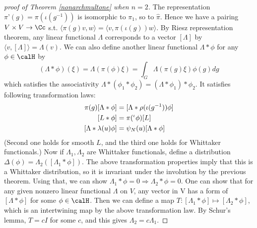 \begin{proof}[proof of Theorem \ref{nonarchmultone} when $n = 2$]
The representation $\pi’(g) = \pi(\iota(g^{-1}))$ is isomorphic to $\pi_1$, so to $\hat{\pi}$. Hence we have a pairing $V \times V \to \Cc$ s.t. $\langle \pi(g)v,w \rangle = \langle v,\pi(\iota(g))w\rangle$. By Riesz representation theorem, any linear functional $\Lambda$ corresponds to a vector $[\Lambda]$ by $\langle v, [\Lambda]\rangle = \Lambda(v)$. 
We can also define another linear functional $\Lambda * \phi$ for any $\phi \in \calH$ by
$$
(\Lambda * \phi)(\xi) = \Lambda(\pi(\phi)\xi) = \int_{G} \Lambda(\pi(g)\xi)\phi(g)dg
$$ 
which satisfies the associativity $\Lambda * (\phi_1 * \phi_2) = (\Lambda * \phi_1) * \phi_2$. 
It satisfies following transformation laws:
\begin{align*}
\pi(g) [\Lambda*\phi] &= [\Lambda * \rho(\iota(g^{-1}))\phi] \\
[L* \phi] &= \pi(\prescript{\iota}{}{}\phi)[L]\\
[\Lambda * \lambda(u)\phi] &= \psi_N(u)[\Lambda * \phi]
\end{align*}
(Second one holds for smooth $L$, and the third one holds for Whittaker functionals.) 
 Now if $\Lambda_1,\Lambda_2$ are Whittaker functionals, define a distribution $\Delta(\phi) = \Lambda_2([\Lambda_1 * \phi])$. 
 The above transformation properties imply that this is a Whittaker distribution, so it is invariant under the involution by the previous theorem. Using that, we can show $\Lambda_1 * \phi = 0 \Rightarrow \Lambda_2 * \phi = 0$. One can show that for any given nonzero linear functional $\Lambda$ on $V$, any vector in V has a form of $[\Lambda * \phi]$ for some $\phi\in \calH$. 
Then  we can define a map $T:[\Lambda_1 * \phi] \mapsto  [\Lambda_2 * \phi]$, which is an intertwining map by the above transformation law. By Schur’s lemma, $T = cI$ for some $c$, and this gives $\Lambda_2 = c\Lambda_1$. 
\end{proof}

